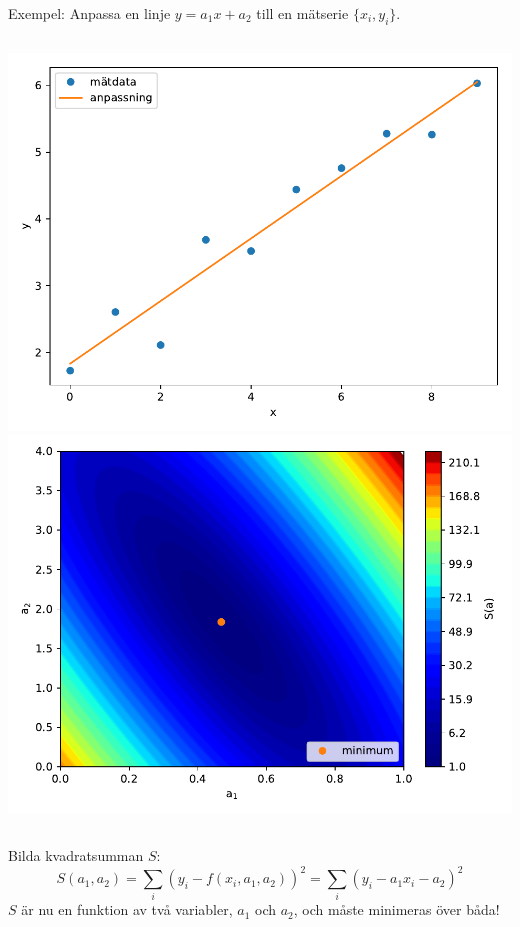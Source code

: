 \documentclass[9pt]{beamer}
\begin{document}
    \begin{frame}
        Exempel: Anpassa en linje $y=a_1x + a_2$ till en mätserie $\{x_i, y_i\}$.
        \begin{columns}[T]
            \includegraphics[width=\textwidth]{anpassning2.pdf}
            \includegraphics[width=\textwidth]{s2.pdf}
        \end{columns}

        Bilda kvadratsumman $S$:
        \begin{equation*}
            S(a_1, a_2) = \sum_i (y_i - f(x_i,a_1,a_2))^2 = \sum_i (y_i - a_1x_i - a_2)^2
        \end{equation*}
        $S$ är nu en funktion av två variabler, $a_1$ och $a_2$, och måste minimeras över båda!
    \end{frame}
\end{document}

